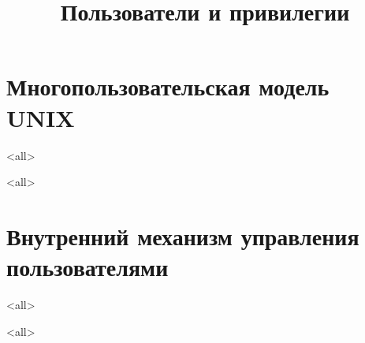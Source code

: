 
\title{Пользователи и привилегии}




\newcommand{\defaultuser}{\$USER}



\begin{frame}
	\frametitle{}
	\titlepage
	\vspace{-0.5cm}
	\begin{center}
	\end{center}
\end{frame}
\section{Многопользовательская модель UNIX}
\mode<all>{}

\mode<all>{}
\section{Внутренний механизм управления пользователями}
\mode<all>{}

\mode<all>{}


